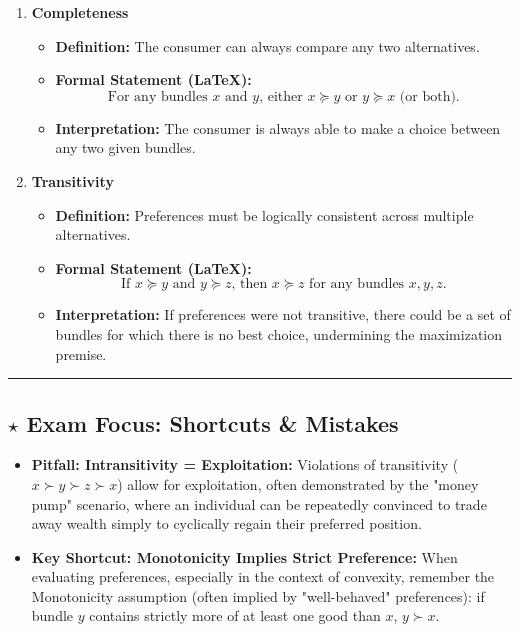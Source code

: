 \documentclass{article}
\begin{document}
\begin{enumerate}
    \item \textbf{Completeness}
    \begin{itemize}
        \item \textbf{Definition:} The consumer can always compare any two alternatives.
        \item \textbf{Formal Statement (LaTeX):} \[\text{For any bundles } x \text{ and } y \text{, either } x \succeq y \text{ or } y \succeq x \text{ (or both).}\]
        \item \textbf{Interpretation:} The consumer is always able to make a choice between any two given bundles.
    \end{itemize}
    \item \textbf{Transitivity}
    \begin{itemize}
        \item \textbf{Definition:} Preferences must be logically consistent across multiple alternatives.
        \item \textbf{Formal Statement (LaTeX):} \[\text{If } x \succeq y \text{ and } y \succeq z \text{, then } x \succeq z \text{ for any bundles } x, y, z.\]
        \item \textbf{Interpretation:} If preferences were not transitive, there could be a set of bundles for which there is no best choice, undermining the maximization premise.
    \end{itemize}
\end{enumerate}

\noindent\rule{\textwidth}{0.4pt}

\subsection*{$\star$ Exam Focus: Shortcuts \& Mistakes}

\begin{itemize}
    \item \textbf{Pitfall: Intransitivity = Exploitation:} Violations of transitivity ($x \succ y \succ z \succ x$) allow for exploitation, often demonstrated by the "money pump" scenario, where an individual can be repeatedly convinced to trade away wealth simply to cyclically regain their preferred position.
    \item \textbf{Key Shortcut: Monotonicity Implies Strict Preference:} When evaluating preferences, especially in the context of convexity, remember the Monotonicity assumption (often implied by "well-behaved" preferences): if bundle $y$ contains strictly more of at least one good than $x$, $y \succ x$.
\end{itemize}
\end{document}
